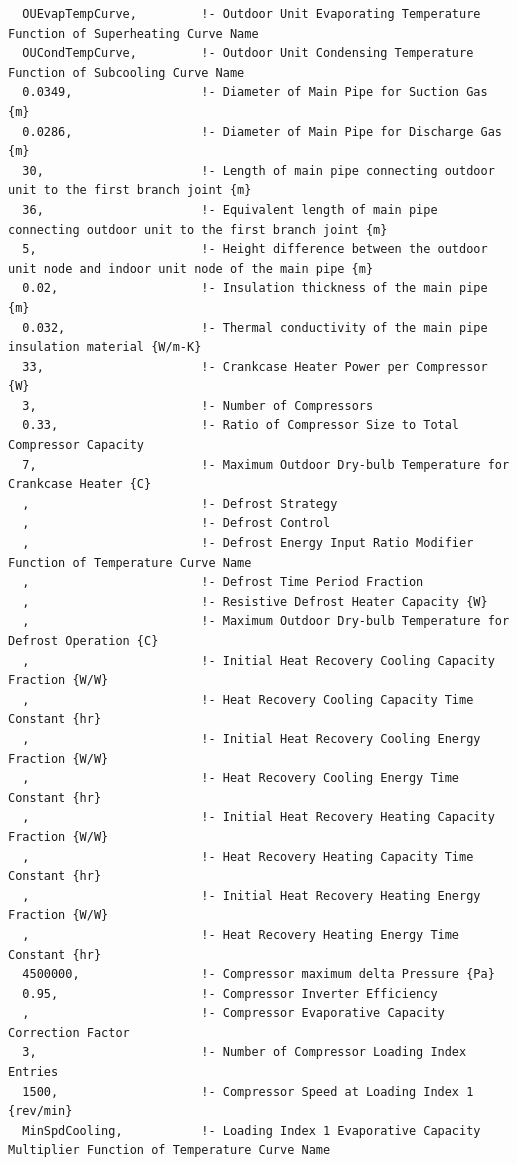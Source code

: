 \begin{lstlisting}
  OUEvapTempCurve,         !- Outdoor Unit Evaporating Temperature Function of Superheating Curve Name
  OUCondTempCurve,         !- Outdoor Unit Condensing Temperature Function of Subcooling Curve Name
  0.0349,                  !- Diameter of Main Pipe for Suction Gas {m}
  0.0286,                  !- Diameter of Main Pipe for Discharge Gas {m}
  30,                      !- Length of main pipe connecting outdoor unit to the first branch joint {m}
  36,                      !- Equivalent length of main pipe connecting outdoor unit to the first branch joint {m}
  5,                       !- Height difference between the outdoor unit node and indoor unit node of the main pipe {m}
  0.02,                    !- Insulation thickness of the main pipe {m}
  0.032,                   !- Thermal conductivity of the main pipe insulation material {W/m-K}
  33,                      !- Crankcase Heater Power per Compressor {W}
  3,                       !- Number of Compressors
  0.33,                    !- Ratio of Compressor Size to Total Compressor Capacity
  7,                       !- Maximum Outdoor Dry-bulb Temperature for Crankcase Heater {C}
  ,                        !- Defrost Strategy
  ,                        !- Defrost Control
  ,                        !- Defrost Energy Input Ratio Modifier Function of Temperature Curve Name
  ,                        !- Defrost Time Period Fraction
  ,                        !- Resistive Defrost Heater Capacity {W}
  ,                        !- Maximum Outdoor Dry-bulb Temperature for Defrost Operation {C}
  ,                        !- Initial Heat Recovery Cooling Capacity Fraction {W/W}
  ,                        !- Heat Recovery Cooling Capacity Time Constant {hr}
  ,                        !- Initial Heat Recovery Cooling Energy Fraction {W/W}
  ,                        !- Heat Recovery Cooling Energy Time Constant {hr}
  ,                        !- Initial Heat Recovery Heating Capacity Fraction {W/W}
  ,                        !- Heat Recovery Heating Capacity Time Constant {hr}
  ,                        !- Initial Heat Recovery Heating Energy Fraction {W/W}
  ,                        !- Heat Recovery Heating Energy Time Constant {hr}
  4500000,                 !- Compressor maximum delta Pressure {Pa}
  0.95,                    !- Compressor Inverter Efficiency
  ,                        !- Compressor Evaporative Capacity Correction Factor
  3,                       !- Number of Compressor Loading Index Entries
  1500,                    !- Compressor Speed at Loading Index 1 {rev/min}
  MinSpdCooling,           !- Loading Index 1 Evaporative Capacity Multiplier Function of Temperature Curve Name

\end{lstlisting}
